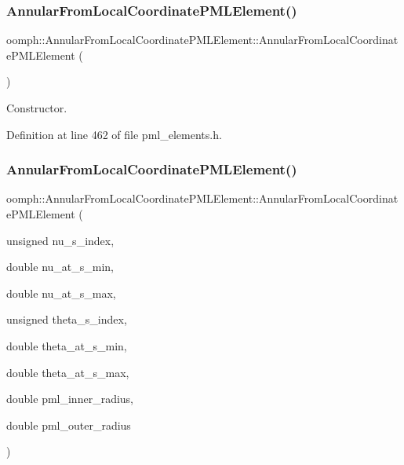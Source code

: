 \subsubsection{\texorpdfstring{Annular\+From\+Local\+Coordinate\+P\+M\+L\+Element()}{AnnularFromLocalCoordinatePMLElement()}\hspace{0.1cm}{\footnotesize\ttfamily [1/2]}}
{\footnotesize\ttfamily oomph\+::\+Annular\+From\+Local\+Coordinate\+P\+M\+L\+Element\+::\+Annular\+From\+Local\+Coordinate\+P\+M\+L\+Element (\begin{DoxyParamCaption}{ }\end{DoxyParamCaption})\hspace{0.3cm}{\ttfamily [inline]}}



Constructor. 



Definition at line 462 of file pml\+\_\+elements.\+h.

\mbox{\label{classoomph_1_1AnnularFromLocalCoordinatePMLElement_a32ef4115b2cce33d4ec93a5620807685}} 
\subsubsection{\texorpdfstring{Annular\+From\+Local\+Coordinate\+P\+M\+L\+Element()}{AnnularFromLocalCoordinatePMLElement()}\hspace{0.1cm}{\footnotesize\ttfamily [2/2]}}
{\footnotesize\ttfamily oomph\+::\+Annular\+From\+Local\+Coordinate\+P\+M\+L\+Element\+::\+Annular\+From\+Local\+Coordinate\+P\+M\+L\+Element (\begin{DoxyParamCaption}\item[{unsigned}]{nu\+\_\+s\+\_\+index,  }\item[{double}]{nu\+\_\+at\+\_\+s\+\_\+min,  }\item[{double}]{nu\+\_\+at\+\_\+s\+\_\+max,  }\item[{unsigned}]{theta\+\_\+s\+\_\+index,  }\item[{double}]{theta\+\_\+at\+\_\+s\+\_\+min,  }\item[{double}]{theta\+\_\+at\+\_\+s\+\_\+max,  }\item[{double}]{pml\+\_\+inner\+\_\+radius,  }\item[{double}]{pml\+\_\+outer\+\_\+radius }\end{DoxyParamCaption})\hspace{0.3cm}{\ttfamily [inline]}}



